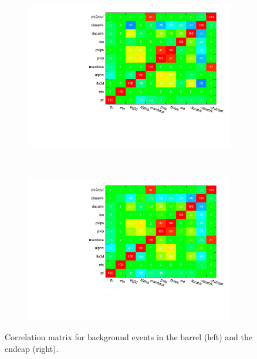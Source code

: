 \documentclass[10pt,a4paper]{article}
\begin{document}
\begin{figure}
		\centering
        \begin{subfigure}[b]{0.45\textwidth}
				\includegraphics[width=\textwidth]{Figures/correlationMatrixB_barrel}
				\label{fig:matrixBBarrel}
        \end{subfigure}
        ~
        \begin{subfigure}[b]{0.45\textwidth}
				\includegraphics[width=\textwidth]{Figures/correlationMatrixB_endcaps}
				\label{fig:matrixBEndcaps}
        \end{subfigure}
        \caption{Correlation matrix for background events in the barrel (left) and the endcap (right).}
        \label{fig:correlationMatricesBackground}
\end{figure}
\end{document}
